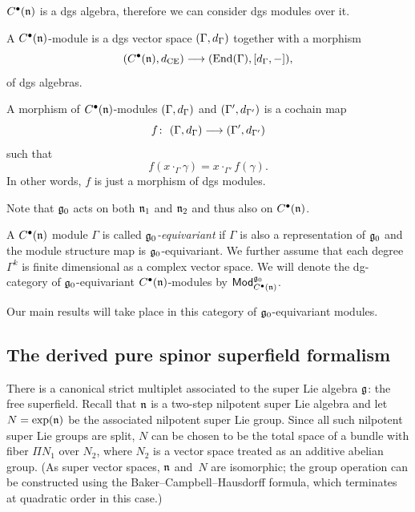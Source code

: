 \documentclass[11pt]{article}
\numberwithin{equation}{section}
\numberwithin{equation}{section}
\def\cat#1{\ensuremath{\mathsf{#1}}}
\DeclareMathOperator{\Mod}{\cat{Mod}}
\def\d{{\rm d}}
\DeclareMathOperator{\End}{End}
\begin{document}
$C^\bullet(\mathfrak n)$ is a dgs algebra, therefore we can consider dgs modules over it.
\begin{dfn}
	A $C^\bullet(\mathfrak n)$-module is a dgs vector space $(\Gamma, \d_\Gamma)$ together with a morphism
	\begin{equation*}
	(C^\bullet(\fn) , \d_{\mathrm{CE}}) \longrightarrow (\End(\Gamma) , [\d_\Gamma , -]),
	\end{equation*}
	of dgs algebras.
\end{dfn}



\begin{dfn}
	A morphism of $C^\bullet(\mathfrak n)$-modules $(\Gamma , \d_\Gamma)$ and $(\Gamma' , \d_{\Gamma'})$ is a cochain map
	\begin{equation*}
	f \colon \ (\Gamma , \d_\Gamma) \longrightarrow (\Gamma' , \d_{\Gamma'})
	\end{equation*}
	such that
	\begin{equation*}
	f(x \cdot_\Gamma \gamma) = x \cdot_{\Gamma'} f(\gamma) .
	\end{equation*}
	In other words, $f$ is just a morphism of dgs modules.
\end{dfn}
Note that $\mathfrak g_0$ acts on both $\mathfrak n_1$ and $\mathfrak n_2$ and thus also on $C^\bullet(\mathfrak n)$.

\begin{dfn}
	A $C^\bullet(\mathfrak n)$ module $\Gamma$ is called \emph{$\mathfrak g_0$-equivariant} if $\Gamma$ is also a representation of $\mathfrak g_0$ and the module structure map is $\mathfrak g_0$-equivariant. We further assume that each degree $\Gamma^k$ is finite dimensional as a complex vector space. We will denote the dg-category of $\mathfrak g_0$-equivariant $C^\bullet(\mathfrak n)$-modules by $\Mod_{C^\bullet(\fn)}^{\fg_0}$.
\end{dfn}

Our main results will take place in this category of $\mathfrak g_0$-equivariant modules.

\subsection{The derived pure spinor superfield formalism}

There is a canonical strict multiplet associated to the super Lie algebra $\mathfrak g$: the free superfield. Recall that $\mathfrak n$ is a two-step nilpotent super Lie algebra and let $N = \exp(\mathfrak n)$ be the associated nilpotent super Lie group. Since all such nilpotent super Lie groups are split, $N$ can be chosen to be the total space of a bundle with fiber $\Pi N_1$ over $N_2$, where $N_2$ is a vector space treated as an additive abelian group. (As super vector spaces, $\mathfrak n$ and~$N$ are isomorphic; the group operation can be constructed using the Baker--Campbell--Hausdorff formula, which terminates at quadratic order in this case.)
\end{document}
